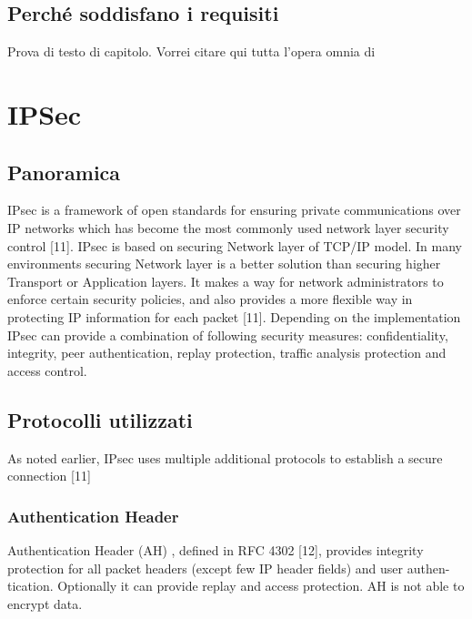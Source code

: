 \subsection{Perché soddisfano i requisiti}
Prova di testo di capitolo. Vorrei citare qui tutta l'opera omnia di



\section{IPSec}
\subsection{Panoramica}
IPsec is a framework of open standards for ensuring private communications over IP networks which has become the most commonly used network layer security control [11]. IPsec is based on securing Network layer of TCP/IP model. In many environments securing Network layer is a better solution than securing higher Transport or Application layers. It makes a way for network administrators to enforce certain security policies, and also provides a more flexible way in protecting IP information for each packet [11]. Depending on the implementation IPsec can provide a combination of following security measures: confidentiality, integrity, peer authentication, replay protection, traffic analysis protection and access control.

\subsection{Protocolli utilizzati}
As noted earlier, IPsec uses multiple additional protocols to establish a secure connection [11]

\subsubsection{Authentication Header}
Authentication Header (AH) , defined in RFC 4302 [12], provides integrity protection for all packet headers (except few IP header fields) and user authen- tication. Optionally it can provide replay and access protection. AH is not able to encrypt data.

